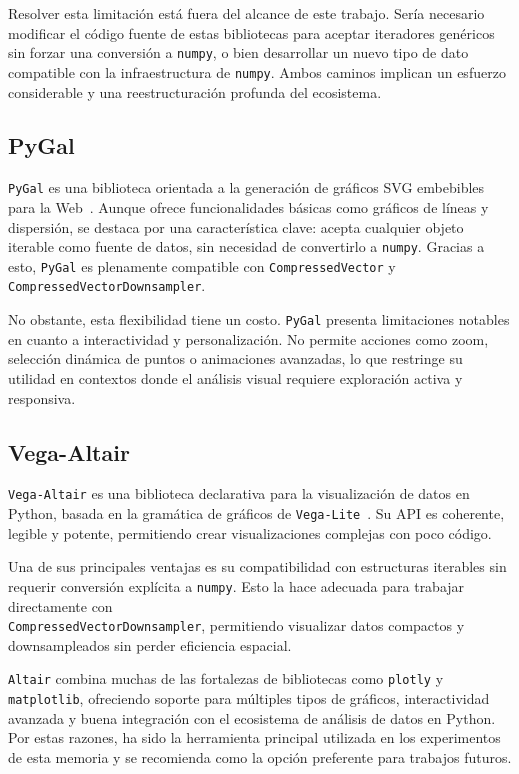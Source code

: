 Resolver esta limitación está fuera del alcance de este trabajo. Sería necesario modificar el código fuente de estas bibliotecas para aceptar iteradores genéricos sin forzar una conversión a \texttt{numpy}, o bien desarrollar un nuevo tipo de dato compatible con la infraestructura de \texttt{numpy}. Ambos caminos implican un esfuerzo considerable y una reestructuración profunda del ecosistema.

\subsection{PyGal}

\texttt{PyGal} es una biblioteca orientada a la generación de gráficos SVG embebibles para la Web~\cite{pygal}. Aunque ofrece funcionalidades básicas como gráficos de líneas y dispersión, se destaca por una característica clave: acepta cualquier objeto iterable como fuente de datos, sin necesidad de convertirlo a \texttt{numpy}. Gracias a esto, \texttt{PyGal} es plenamente compatible con \texttt{CompressedVector} y \texttt{CompressedVectorDownsampler}.

No obstante, esta flexibilidad tiene un costo. \texttt{PyGal} presenta limitaciones notables en cuanto a interactividad y personalización. No permite acciones como zoom, selección dinámica de puntos o animaciones avanzadas, lo que restringe su utilidad en contextos donde el análisis visual requiere exploración activa y responsiva.

\subsection{Vega-Altair}

\texttt{Vega-Altair} es una biblioteca declarativa para la visualización de datos en Python, basada en la gramática de gráficos de \texttt{Vega-Lite}~\cite{altair}. Su API es coherente, legible y potente, permitiendo crear visualizaciones complejas con poco código.

Una de sus principales ventajas es su compatibilidad con estructuras iterables sin requerir conversión explícita a \texttt{numpy}. Esto la hace adecuada para trabajar directamente con \\ \texttt{CompressedVectorDownsampler}, permitiendo visualizar datos compactos y downsampleados sin perder eficiencia espacial.

\texttt{Altair} combina muchas de las fortalezas de bibliotecas como \texttt{plotly} y \texttt{matplotlib}, ofreciendo soporte para múltiples tipos de gráficos, interactividad avanzada y buena integración con el ecosistema de análisis de datos en Python. Por estas razones, ha sido la herramienta principal utilizada en los experimentos de esta memoria y se recomienda como la opción preferente para trabajos futuros.

